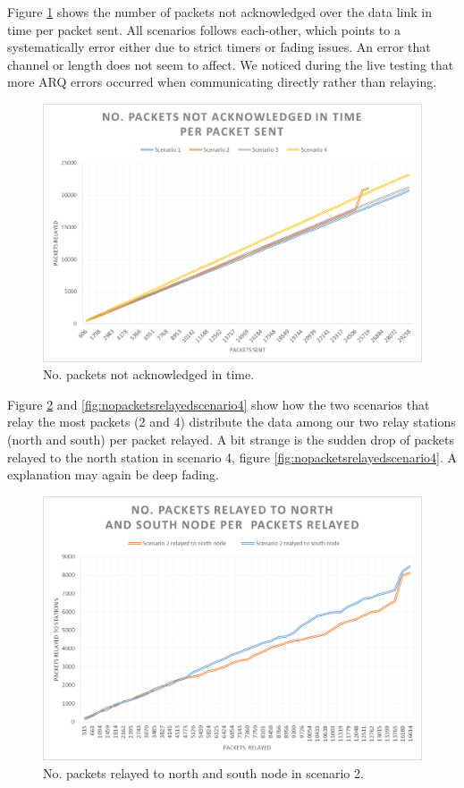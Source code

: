 \noindent Figure \ref{fig:nopacketsnotackintime} shows the number of packets not acknowledged over the data link in time per packet sent. All scenarios follows each-other, which points to a systematically error either due to strict timers or fading issues. An error that channel or length does not seem to affect. We noticed during the live testing that more ARQ errors occurred when communicating directly rather than relaying.

\begin{figure}[H]
	\centering
	\includegraphics[width=0.8\linewidth]{results/NoPacketsNotACKInTime}
	\caption{No. packets not acknowledged in time.}
	\label{fig:nopacketsnotackintime}
\end{figure}

\noindent Figure \ref{fig:nopacketsrelayedscenario2} and \ref{fig:nopacketsrelayedscenario4} show how the two scenarios that relay the most packets (2 and 4) distribute the data among our two relay stations (north and south) per packet relayed. A bit strange is the sudden drop of packets relayed to the north station in scenario 4, figure  \ref{fig:nopacketsrelayedscenario4}. A explanation may again be deep fading.

\begin{figure}[H]
	\centering
	\includegraphics[width=0.8\linewidth]{results/NoPacketsRelayedScenario2}
	\caption{No. packets relayed to north and south node in scenario 2.}
	\label{fig:nopacketsrelayedscenario2}
\end{figure}

